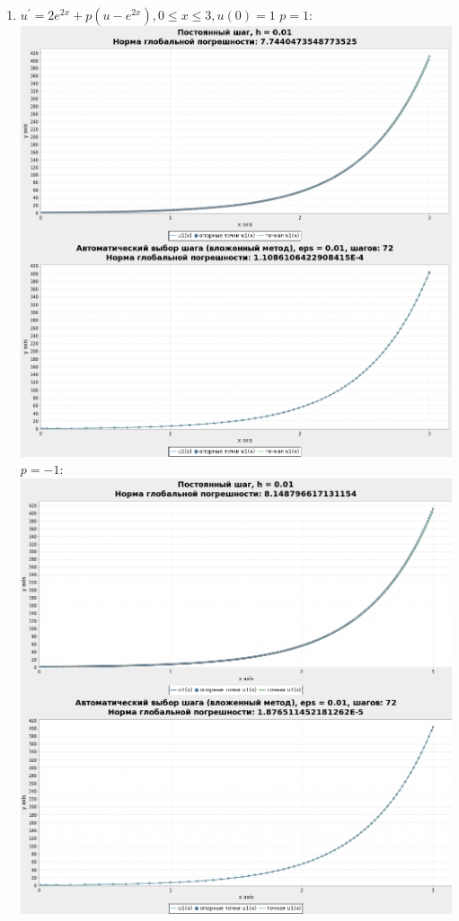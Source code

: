 \documentclass[a4paper,12pt]{article}
\begin{document}
\begin{flushleft}
\begin{enumerate}
    \item 
      \(u^{'}=2 e^{2x}+p(u-e^{2x}), 0 \le x \le 3, u(0) = 1\)\linebreak\linebreak
      $p = 1:$\linebreak\linebreak\includegraphics{xp1.png}\linebreak\linebreak
      $p = -1:$\linebreak\linebreak\includegraphics{xpm1.png}\linebreak\linebreak

\end{enumerate}
\end{flushleft}
\end{document}
